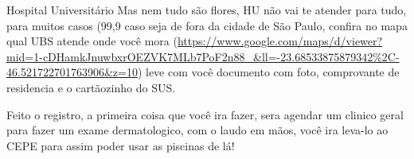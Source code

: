 \begin{secao}{Hospital Universitário}
Mas nem tudo são flores, HU não vai te atender para tudo, para muitos casos 
(99,9%
caso seja de fora da cidade de São Paulo, confira no mapa qual UBS atende onde você mora
(\url{https://www.google.com/maps/d/viewer?mid=1-cDHamkJnuwbxrOEZVK7MLb7PoF2n88_&ll=-23.68533875879342%2C-46.521722701763906&z=10})
leve com você documento com foto, comprovante de residencia e o cartãozinho do SUS.

Feito o registro, a primeira coisa que você ira fazer, sera agendar um clinico geral para fazer um exame dermatologico,
com o laudo em mãos, você ira leva-lo ao CEPE para assim poder usar as piscinas de lá!

\end{secao}
